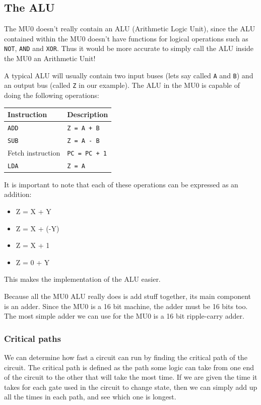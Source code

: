 \subsection{The ALU}

The MU0 doesn't really contain an ALU (Arithmetic Logic Unit), since the ALU
contained within the MU0 doesn't have functions for logical operations such as
{\tt NOT}, {\tt AND} and {\tt XOR}. Thus it would be more accurate to simply
call the ALU inside the MU0 an Arithmetic Unit!

A typical ALU will usually contain two input buses (lets say called {\tt A} and
{\tt B}) and an output bus (called {\tt Z} in our example). The ALU in the MU0 is
capable of doing the following operations:

\begin{center}
	\begin{tabular}{|l|l|}
		\hline
		{\bf Instruction} & {\bf Description}\\ \hline
		{\tt ADD} & {\tt Z = A + B}\\ \hline
		{\tt SUB} & {\tt Z = A - B}\\ \hline
		Fetch instruction & {\tt PC = PC + 1}\\ \hline
		{\tt LDA} & {\tt Z = A}\\ \hline
	\end{tabular}
\end{center}

It is important to note that each of these operations can be expressed as an
addition:

\begin{itemize}
	\item Z = X + Y
	\item Z = X + (-Y)
	\item Z = X + 1
	\item Z = 0 + Y
\end{itemize}

This makes the implementation of the ALU easier.

Because all the MU0 ALU really does is add stuff together, its main component is
an adder. Since the MU0 is a 16 bit machine, the adder must be 16 bits too. The
most simple adder we can use for the MU0 is a 16 bit ripple-carry adder.

\subsubsection{Critical paths}

We can determine how fast a circuit can run by finding the critical path of the
circuit. The critical path is defined as the path some logic can take from one
end of the circuit to the other that will take the most time. If we are given
the time it takes for each gate used in the circuit to change state, then we can
simply add up all the times in each path, and see which one is longest.

